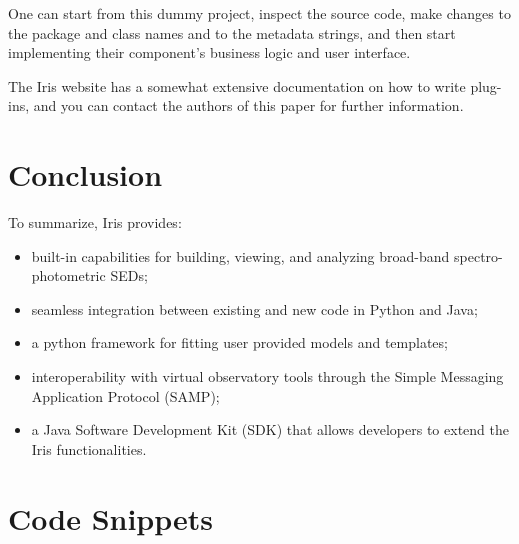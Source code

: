 \documentclass[preprint,12pt,3p]{elsarticle}
\begin{document}
One can start from this dummy project, inspect the source code, make changes to the package and class names and to the metadata strings, and then start implementing their component's business logic and user interface.

The Iris website has a somewhat extensive documentation on how to write plug-ins, and you can contact the authors of this paper for further information.

\section{Conclusion}
\label{sec:conclusion}

To summarize, Iris provides:
\begin{itemize}
\item built-in capabilities for building, viewing, and analyzing broad-band spectro-photometric SEDs;
\item seamless integration between existing and new code in Python and Java;
\item a python framework for fitting user provided models and templates;
\item interoperability with virtual observatory tools through the Simple Messaging Application Protocol (SAMP);
\item a Java Software Development Kit (SDK) that allows developers to extend the Iris functionalities.
\end{itemize}

\section{Code Snippets}
\end{document}
